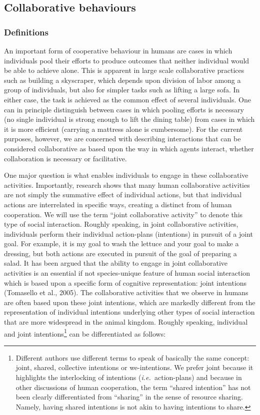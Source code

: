\documentclass{article}
\newcommand{\ie}{{\textit{i.e.~}}}
\begin{document}
\subsection{Collaborative behaviours}

\subsubsection{Definitions}

An important form of cooperative behaviour in humans are cases in which
individuals pool their efforts to produce outcomes that neither individual
would be able to achieve alone. This is apparent in large scale collaborative
practices such as building a skyscraper, which depends upon division of labor
among a group of individuals, but also for simpler tasks such as lifting a
large sofa. In either case, the task is achieved as the common effect of
several individuals. One can in principle distinguish between cases in which
pooling efforts is necessary (no single individual is strong enough to lift the
dining table) from cases in which it is more efficient (carrying a mattress
alone is cumbersome). For the current purposes, however, we are concerned with
describing interactions that can be considered collaborative as based upon the
way in which agents interact, whether collaboration is necessary or
facilitative.

One major question is what enables individuals to engage in these collaborative
activities. Importantly, research shows that many human collaborative
activities are not simply the summative effect of individual actions, but that
individual actions are interrelated in specific ways, creating a distinct from
of human cooperation. We will use the term ``joint collaborative activity''
to denote this type of social interaction. Roughly speaking, in joint
collaborative activities, individuals perform their individual action-plans
(intentions) in pursuit of a joint goal. For example, it is my goal to wash the
lettuce and your goal to make a dressing, but both actions are executed in
pursuit of the goal of preparing a salad. It has been argued that the ability
to engage in joint collaborative activities is an essential if not
species-unique feature of human social interaction which is based upon a
specific form of cognitive representation: joint intentions (Tomasello et al.,
2005). The collaborative activities that we observe in humans are often based
upon these joint intentions, which are markedly different from the
representation of individual intentions underlying other types of social
interaction that are more widespread in the animal kingdom. Roughly speaking,
individual and joint intentions\footnote{ Different authors use different terms
to speak of basically the same concept: joint, shared, collective intentions or
we-intentions. We prefer joint because it highlights the interlocking of
intentions (\ie action-plans) and because in other discussions of human
cooperation, the term ``shared intention'' has not been clearly differentiated
from ``sharing'' in the sense of resource sharing. Namely, having shared
intentions is not akin to having intentions to share.\par } can be
differentiated as follows:
\end{document}
